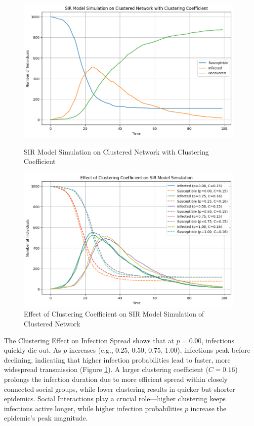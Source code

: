 \documentclass[9 pt]{article} %
\begin{document}
\begin{figure}[h]
    \centering
    \begin{minipage}[t]{0.45\textwidth}
        \centering
        \includegraphics[width=\linewidth]{Figures/analysis_4_cc_0.15.png}
        \caption{SIR Model Simulation on Clustered Network with Clustering Coefficient}
        \label{analysis_4_sne_1}
    \end{minipage}
    \hspace{0.05\textwidth}
    \begin{minipage}[t]{0.45\textwidth}
        \centering
        \includegraphics[width=\linewidth]{Figures/analysis_4_c_change.png}
        \caption{Effect of Clustering Coefficient on SIR Model Simulation of Clustered Network}
        \label{analysis_4_sne_change}
    \end{minipage}
\end{figure}

The Clustering Effect on Infection Spread shows that at \( p = 0.00 \), infections quickly die out. As \( p \) increases (e.g., 0.25, 0.50, 0.75, 1.00), infections peak before declining, indicating that higher infection probabilities lead to faster, more widespread transmission (Figure \ref{analysis_4_sne_change}). A larger clustering coefficient (\( C = 0.16 \)) prolongs the infection duration due to more efficient spread within closely connected social groups, while lower clustering results in quicker but shorter epidemics. Social Interactions play a crucial role—higher clustering keeps infections active longer, while higher infection probabilities \( p \) increase the epidemic's peak magnitude.
\end{document}
